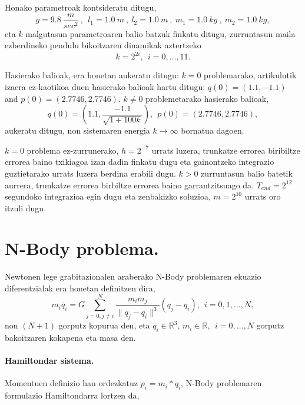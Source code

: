 Honako parametroak kontsideratu ditugu,
\begin{equation*} \label{eq:17}
g=9.8 \ \frac{m}{sec^2}\ ,\ \ l_1=1.0 \ m \ , \ l_2=1.0 \ m\ , \ m_1=1.0 \ kg\ , \ m_2=1.0 \ kg,
\end{equation*} 
eta $k$ malgutasun parametroaren balio batzuk finkatu ditugu, zurruntasun maila ezberdineko pendulu bikoitzaren dinamikak aztertzeko 
\begin{equation*}
k=2^{2i}, \ \ i=0,\dots,11.
\end{equation*}  

Hasierako balioak, era honetan aukeratu ditugu: $k=0$ problemarako, \cite{Dumitru} artikulutik izaera ez-kaotikoa duen hasierako balioak hartu ditugu: $q(0)=(1.1, -1.1)$ and $p(0)=(2.7746,2.7746)$. $k\neq 0$ problemetarako hasierako balioak,
\begin{equation*}
q(0)=\left(1.1, \frac{-1.1}{\sqrt{1+100k}}\right), \ \ 
p(0)=(2.7746,2.7746),
\end{equation*}
aukeratu ditugu, non sistemaren energia $k \rightarrow \infty$ bornatua dagoen.

$k=0$ problema ez-zurrunerako, $h=2^{-7}$ urrats luzera, trunkatze errorea biribiltze errorea baino txikiagoa izan dadin finkatu dugu eta gainontzeko integrazio guztietarako urrats luzera berdina erabili dugu. $k>0$ zurruntasun balio batetik aurrera, trunkatze errorea birbiltze errorea baino garrantzitsuago da. $T_{end}=2^{12}$  segundoko integrazioa egin dugu eta zenbakizko soluzioa, $m=2^{10}$ urrats oro itzuli dugu.   

\section{N-Body problema.}
\label{s:33}

Newtonen lege grabitazionalen araberako N-Body problemaren ekuazio diferentzialak era honetan definitzen dira,
\begin{equation}
m_i\ddot{q_i}= G \sum_{j=0,j \neq i}^{N} \frac{m_im_j}{\|q_j-q_i\|^3} (q_j-q_i) , \ \  i=0,1,\dots, N,
\end{equation}
non $(N+1)$ gorputz kopurua den, eta $q_i\in \mathbb{R}^3$, $m_i \in \mathbb{R}, \ \ i=0,\dots,N$ gorputz bakoitzaren kokapena eta masa den. 

\paragraph*{Hamiltondar sistema.}
Momentuen definizio hau ordezkatuz  $p_i=m_i*\dot{q}_i$, N-Body problemaren formulazio Hamiltondarra  lortzen da,  

